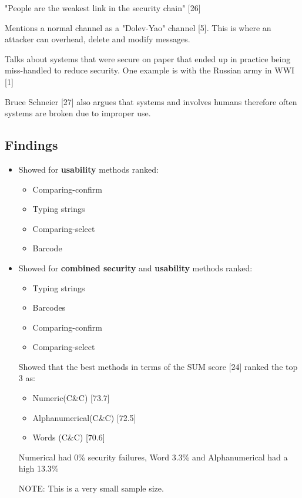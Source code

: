 "People are the weakest link in the security chain" [26]

Mentions a normal channel as a "Dolev-Yao" channel [5]. This is where an attacker can overhead, delete and modify messages.

Talks about systems that were secure on paper that ended up in practice being miss-handled to reduce security. One example is with the Russian army in WWI [1]

Bruce Schneier [27] also argues that systems and involves humans therefore often systems are broken due to improper use.


\subsection{Findings}
\begin{itemize}
    \item Showed for \textbf{usability} methods ranked:
    \begin{itemize}
        \item Comparing-confirm
        \item Typing strings
        \item Comparing-select
        \item Barcode
    \end{itemize}

    \item Showed for \textbf{combined security} and \textbf{usability} methods ranked:
    \begin{itemize}
        \item Typing strings
        \item Barcodes
        \item Comparing-confirm
        \item Comparing-select
    \end{itemize}

    Showed that the best methods in terms of the SUM score [24] ranked the top 3 as:
    \begin{itemize}
        \item Numeric(C\&C)          [73.7]
        \item Alphanumerical(C\&C)   [72.5]
        \item Words (C\&C)           [70.6]
    \end{itemize}

    Numerical had 0\% security failures, Word 3.3\% and Alphanumerical had a high 13.3\% 

    NOTE: This is a very small sample size.
\end{itemize}